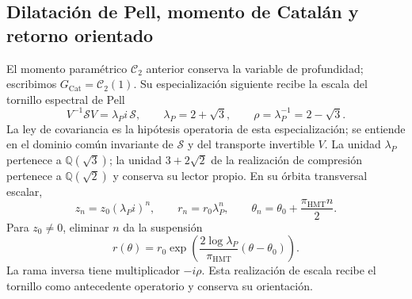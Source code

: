 \subsection{Dilatación de Pell, momento de Catalán y retorno orientado}
\label{corpus9:iv:pell}

El momento paramétrico \(\mathcal C_2\) anterior conserva la
variable de profundidad; escribimos
\(G_{\mathrm{Cat}}=\mathcal C_2(1)\).
Su especialización siguiente recibe
la escala del tornillo espectral de Pell
\[
 V^{-1}\mathscr S V=\lambda_P i\,\mathscr S,\qquad
 \lambda_P=2+\sqrt3,\qquad \rho=\lambda_P^{-1}=2-\sqrt3.
\]
La ley de covariancia es la hipótesis operatoria de esta
especialización; se entiende en el dominio común invariante
de \(\mathscr S\) y del transporte invertible \(V\).
La unidad \(\lambda_P\) pertenece a \(\mathbb Q(\sqrt3)\);
la unidad \(3+2\sqrt2\) de la realización de compresión
pertenece a \(\mathbb Q(\sqrt2)\) y conserva su lector propio.
En su órbita transversal escalar,
\[
 z_n=z_0(\lambda_P i)^n,\qquad
 r_n=r_0\lambda_P^n,\qquad
 \theta_n=\theta_0+\frac{\pi_{\mathrm{HMT}}n}{2}.
\]
Para \(z_0\ne0\), eliminar \(n\) da la suspensión
\[
 r(\theta)=r_0\exp\!\left(
   \frac{2\log\lambda_P}{\pi_{\mathrm{HMT}}}
   (\theta-\theta_0)\right).
\]
La rama inversa tiene multiplicador \(-i\rho\). Esta
realización de escala recibe el tornillo como antecedente
operatorio y conserva su orientación.

